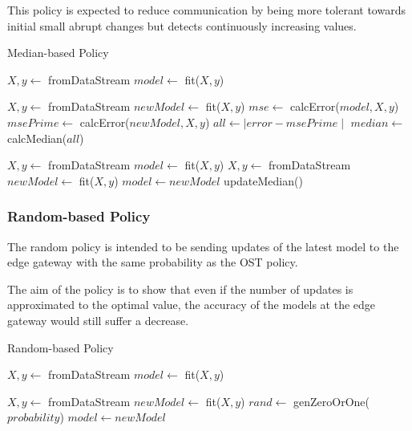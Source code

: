 \documentclass{mpaper}
\begin{document}
This policy is expected to reduce communication by being more tolerant towards initial small abrupt changes but detects continuously increasing values.

\begin{algorithm}[h!]
\caption{Median-based Policy}\label{polM}
\begin{algorithmic}
    \State $X, y \gets$ fromDataStream
    \State $model \gets$ fit($X,y$)
    
        \State $X, y \gets$ fromDataStream
        \State $newModel \gets$ fit($X,y$)
        \State $mse \gets$ calcError($model,X,y$)
        \State $msePrime \gets$ calcError($newModel,X,y$)
        \State $all \gets \mid error - msePrime \mid$
    \EndFor
    \State $median \gets$ calcMedian($all$)
\EndProcedure

\State $X, y \gets$ fromDataStream
\State $model \gets$ fit($X,y$)
    \State $X, y \gets$ fromDataStream
    \State $newModel \gets$ fit($X,y$)
        \State $model \gets newModel$ 
    \EndIf
        \State updateMedian()
    \EndIf
\EndWhile
\end{algorithmic}
\end{algorithm}

\subsubsection{Random-based Policy}
The random policy is intended to be sending updates of the latest model to the edge gateway with the same probability as the OST policy.

The aim of the policy is to show that even if the number of updates is approximated to the optimal value, the accuracy of the models at the edge gateway would still suffer a decrease.

\begin{algorithm}[h]
\caption{Random-based Policy}\label{polR}
\begin{algorithmic}
\State $X,y \gets$ fromDataStream
\State $model \gets$ fit($X,y$)

    \State $X, y \gets$ fromDataStream
    \State $newModel \gets$ fit($X,y$)
    \State $rand \gets$ genZeroOrOne($probability$)
        \State $model \gets newModel$ 
    \EndIf
\EndWhile
\end{algorithmic}
\end{algorithm}
\vfill
\end{document}
